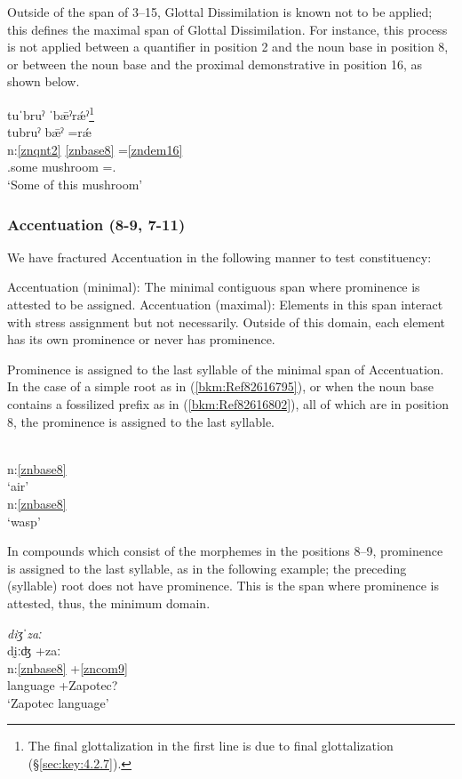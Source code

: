 \documentclass[output=paper]{langscibook}
\begin{document}
Outside of the span of 3–15, Glottal Dissimilation is known not to be applied; this defines the maximal span of Glottal Dissimilation. For instance, this process is not applied between a quantifier in position 2 and the noun base in position 8, or between the noun base and the proximal demonstrative in position 16, as shown below.

\ea\label{bkm:Ref83825533}
{tuˈbruˀ ˈbǣˀrǽˀ\footnote{The final glottalization in the first line is due to final glottalization (\S\ref{sec:key:4.2.7}).}}\\
\glll tubruˀ bǣˀ =rǽ\\
n:\ref{znqnt2} \ref{znbase8} =\ref{zndem16}\\
\Qr{}.some mushroom =\Dem.\Prox{}\\
\glt `Some of this mushroom'
\z

\subsubsection{Accentuation (8-9, 7-11)}
We have fractured Accentuation in the following manner to test constituency:

\ea Accentuation (minimal): The minimal contiguous span where prominence is attested to be assigned.
\ex Accentuation (maximal): Elements in this span interact with stress assignment but not necessarily. Outside of this domain, each element has its own prominence or never has prominence. 
\z

Prominence is assigned to the last syllable of the minimal span of Accentuation. In the case of a simple root as in (\ref{bkm:Ref82616795}), or when the noun base contains a fossilized prefix as in (\ref{bkm:Ref82616802}), all of which are in position 8, the prominence is assigned to the last syllable.

\ea\label{bkm:Ref82616795}
\\ 
n:\ref{znbase8} \\
\glt `air'
\ex\label{bkm:Ref82616802}
\\
n:\ref{znbase8}\\
\glt `wasp'
\z

In compounds which consist of the morphemes in the positions 8–9, prominence is assigned to the last syllable, as in the following example; the preceding (syllable) root does not have prominence. This is the span where prominence is attested, thus, the minimum domain.

\ea\label{ex:key:zap:127}
{\textit{diʒˈzaː}}\\
\glll dḭːʤ +zaː\\
n:\ref{znbase8}  +\ref{zncom9} \\
language +Zapotec?\\
\glt `Zapotec language'
\z
\end{document}
